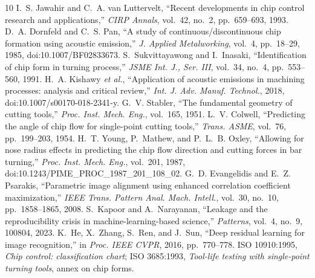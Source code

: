 \documentclass[conference,a4paper]{IEEEtran}
\begin{document}
\begin{thebibliography}{10}
 I.~S. Jawahir and C.~A. van Luttervelt, ``Recent developments in chip control research and applications,'' \emph{CIRP Annals}, vol.~42, no.~2, pp.~659--693, 1993.
 D.~A. Dornfeld and C.~S. Pan, ``A study of continuous/discontinuous chip formation using acoustic emission,'' \emph{J. Applied Metalworking}, vol.~4, pp.~18--29, 1985, doi:10.1007/BF02833673.
 S.~Sukvittayawong and I.~Inasaki, ``Identification of chip form in turning process,'' \emph{JSME Int. J., Ser. III}, vol.~34, no.~4, pp.~553--560, 1991.
 H.~A. Kishawy \emph{et al.}, ``Application of acoustic emissions in machining processes: analysis and critical review,'' \emph{Int. J. Adv. Manuf. Technol.}, 2018, doi:10.1007/s00170-018-2341-y.
 G.~V. Stabler, ``The fundamental geometry of cutting tools,'' \emph{Proc. Inst. Mech. Eng.}, vol.~165, 1951.
 L.~V. Colwell, ``Predicting the angle of chip flow for single-point cutting tools,'' \emph{Trans. ASME}, vol.~76, pp.~199--203, 1954.
 H.~T. Young, P.~Mathew, and P.~L.~B. Oxley, ``Allowing for nose radius effects in predicting the chip flow direction and cutting forces in bar turning,'' \emph{Proc. Inst. Mech. Eng.}, vol.~201, 1987, doi:10.1243/PIME\_PROC\_1987\_201\_108\_02.
 G.~D. Evangelidis and E.~Z. Psarakis, ``Parametric image alignment using enhanced correlation coefficient maximization,'' \emph{IEEE Trans. Pattern Anal. Mach. Intell.}, vol.~30, no.~10, pp.~1858--1865, 2008.
 S.~Kapoor and A.~Narayanan, ``Leakage and the reproducibility crisis in machine-learning-based science,'' \emph{Patterns}, vol.~4, no.~9, 100804, 2023.
 K.~He, X.~Zhang, S.~Ren, and J.~Sun, ``Deep residual learning for image recognition,'' in \emph{Proc. IEEE CVPR}, 2016, pp.~770--778.
 ISO 10910:1995, \emph{Chip control: classification chart}; ISO 3685:1993, \emph{Tool-life testing with single-point turning tools}, annex on chip forms.
\end{thebibliography}
\end{document}

